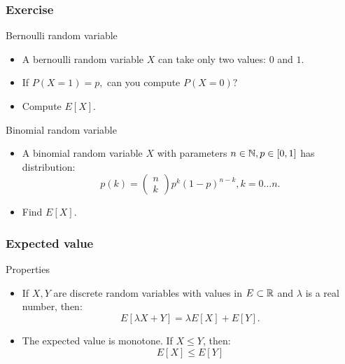 \documentclass[main.tex]{subfiles}
\begin{document}
\begin{frame}
    \frametitle{Exercise}
\begin{block}{Bernoulli random variable}
    \begin{itemize}
        \item<+-> A bernoulli random variable $X$ can take only two values: $0$ and $1$.
        \item<+-> If $P\left( X=1 \right)  = p, $ can you compute $P\left( X=0 \right) ?$
        \item<+-> Compute $E\left[ X \right].$
    \end{itemize}
\end{block}
\begin{block}{Binomial random variable}
    \begin{itemize}
        \item<+-> A binomial random variable $X$ with parameters $n \in \mathbb{N}, p \in [0,1]$ has 
        distribution:
        \begin{equation}
            p(k) = \begin{pmatrix}
                n \\ k
            \end{pmatrix} p^k \left( 1-p \right)^{n-k}, k = 0 \dots n.
        \end{equation}
        \item<+-> Find $E\left[ X \right].$
    \end{itemize}
\end{block}

\end{frame}
\begin{frame}
    \frametitle{Expected value}
\begin{block}{Properties}
    \begin{itemize}
        \item<+-> If $X,Y$ are discrete random variables with values in $E \subset \mathbb{R}$ and 
        $\lambda$ is a real number, then:
        \begin{equation}
            E\left[ \lambda X + Y \right] = \lambda E\left[ X \right] + E \left[ Y \right].
        \end{equation}
        \item<+-> The expected value is monotone. If $X \leq Y$, then:
        \begin{equation}
            E\left[ X \right] \leq E \left[ Y \right]
        \end{equation}
       
    \end{itemize}
\end{block}
\end{frame}
\end{document}
